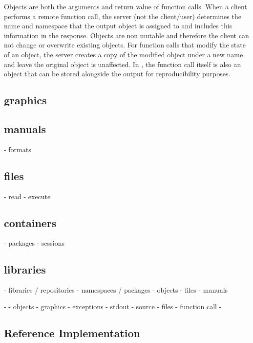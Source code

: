 Objects are both the arguments and return value of function calls. When a client performs a remote function call, the server (not the client/user) determines the name and namespace that the output object is assigned to and includes this information in the response. Objects are non mutable and therefore the client can not change or overwrite existing objects. For function calls that modify the state of an object, the server creates a copy of the modified object under a new name and leave the original object is unaffected. In \R, the function call itself is also an object that can be stored alongside the output for reproducibility purposes. 

\subsection{graphics}

\subsection{manuals}

- formats

\subsection{files}

- read
- execute

\subsection{containers}
 
- packages
- sessions

\subsection{libraries}





- libraries / repositories
- namespaces / packages
- objects
- files
- manuals

-
- objects
- graphics
- exceptions
- stdout
- source
- files
- function call
- 



\subsection{Reference Implementation}

